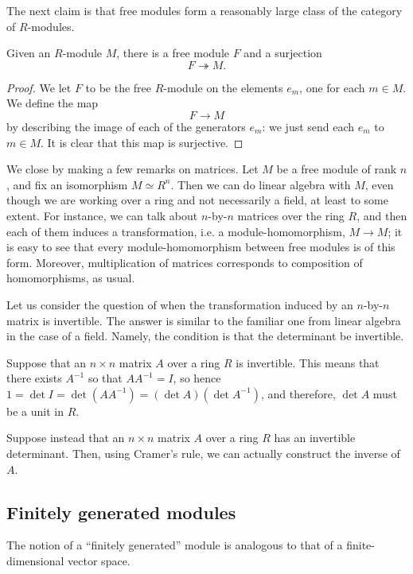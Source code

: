 The next claim is that free modules form a reasonably large class of the
category of $R$-modules.

\begin{proposition} \label{freesurjection} 
Given an $R$-module $M$, there is a free module $F$ and a surjection
\[ F \twoheadrightarrow M.  \]
\end{proposition} 
\begin{proof} 
We let $F$ to be the free $R$-module on the elements $e_m$, one for each $m
\in M$. We define the map
\[ F \to M  \]
by describing the image of each of the generators $e_m$: we just send each
$e_m$ to $m \in M$. It is clear that this map is surjective.
\end{proof} 


We close by making a few remarks on matrices.
Let $M$ be a free module of rank $n$, and fix an isomorphism $M \simeq R^n$.
Then we can do linear algebra with $M$, even though we are working over a
ring and not necessarily a field, at least to some extent.
For instance, we can talk about $n$-by-$n$ matrices over the ring $R$, and
then each of them induces a transformation, i.e. a module-homomorphism, $M \to
M$; it is easy to see that every module-homomorphism between free modules is
of this form. Moreover, multiplication of matrices corresponds to composition
of homomorphisms, as usual.
 
\begin{example} Let us consider the question of when the transformation
induced by an $n$-by-$n$ matrix is invertible. The answer is similar to the
familiar one from linear algebra in the case of a field. Namely, the condition
is that the determinant be invertible.

Suppose that an $n \times n$ matrix $A$ over a ring $R$ is invertible. This
means that there exists $A^{-1}$ so that $A A^{-1} = I$, so hence
$1 = \det I = \det(A A^{-1}) = (\det A) (\det A^{-1})$, and therefore, 
$\det A$ must be a unit in $R$.

Suppose instead that an $n \times n$ matrix $A$ over a ring $R$ has an
invertible determinant. Then, using Cramer's rule, we can actually construct
the inverse of $A$.
\end{example} 


\subsection{Finitely generated modules}

The notion of a ``finitely generated'' module is analogous to that of a
finite-dimensional vector space.

